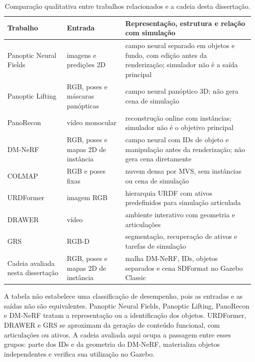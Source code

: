 \begin{table}[H]
\centering
\small
\renewcommand{\arraystretch}{1.12}
\caption{Comparação qualitativa entre trabalhos relacionados e a cadeia desta dissertação.}
\label{tab:comparacao_metodos}
\begin{tabularx}{\textwidth}{>{\raggedright\arraybackslash}p{2.55cm}>{\raggedright\arraybackslash}p{3.05cm}>{\raggedright\arraybackslash}X}
\toprule
\textbf{Trabalho} & \textbf{Entrada} & \textbf{Representação, estrutura e relação com simulação} \\
\midrule
Panoptic Neural Fields & imagens e predições 2D & campo neural separado em objetos e fundo, com edição antes da renderização; simulador não é a saída principal \\
Panoptic Lifting & RGB, poses e máscaras panópticas & campo neural panóptico 3D; não gera cena de simulação \\
PanoRecon & vídeo monocular & reconstrução online com instâncias; simulador não é o objetivo principal \\
DM-NeRF & RGB, poses e mapas 2D de instância & campo neural com IDs de objeto e manipulação antes da renderização; não gera cena diretamente \\
COLMAP & RGB e poses fixas & nuvem densa por MVS, sem instâncias ou cena de simulação \\
URDFormer & imagem RGB & hierarquia URDF com ativos predefinidos para simulação articulada \\
DRAWER & vídeo & ambiente interativo com geometria e articulações \\
GRS & RGB-D & segmentação, recuperação de ativos e tarefas de simulação \\
Cadeia avaliada nesta dissertação & RGB, poses e mapas 2D de instância & malha DM-NeRF, IDs, objetos separados e cena SDFormat no Gazebo Classic \\
\bottomrule
\end{tabularx}
\end{table}

A tabela não estabelece uma classificação de desempenho, pois as entradas e as saídas não são equivalentes. Panoptic Neural Fields, Panoptic Lifting, PanoRecon e DM-NeRF tratam a representação ou a identificação dos objetos. URDFormer, DRAWER e GRS se aproximam da geração de conteúdo funcional, com articulações ou ativos. A cadeia avaliada aqui ocupa a passagem entre esses grupos: parte dos IDs e da geometria do DM-NeRF, materializa objetos independentes e verifica sua utilização no Gazebo.
